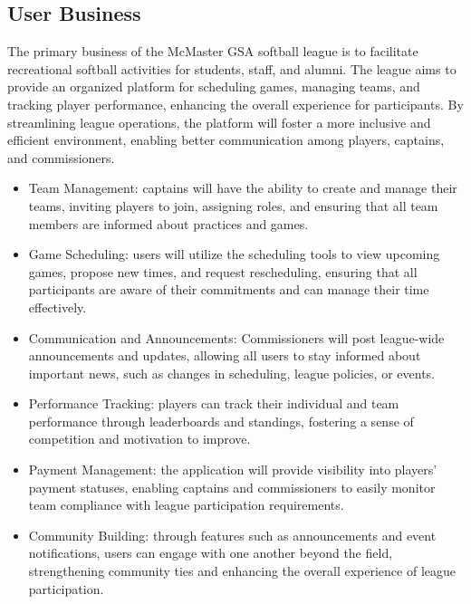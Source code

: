 \documentclass[12pt]{article}
\begin{document}
\subsection{User Business}
The primary business of the McMaster GSA softball league is to facilitate recreational softball activities for students, staff, and alumni. The league aims to provide an organized platform for scheduling games, managing teams, and tracking player performance, enhancing the overall experience for participants. By streamlining league operations, the platform will foster a more inclusive and efficient environment, enabling better communication among players, captains, and commissioners.\
\begin{itemize}
  \item Team Management: captains will have the ability to create and manage their teams, inviting players to join, assigning roles, and ensuring that all team members are informed about practices and games.
  \item Game Scheduling: users will utilize the scheduling tools to view upcoming games, propose new times, and request rescheduling, ensuring that all participants are aware of their commitments and can manage their time effectively.
  \item Communication and Announcements: Commissioners will post league-wide announcements and updates, allowing all users to stay informed about important news, such as changes in scheduling, league policies, or events.
  \item Performance Tracking: players can track their individual and team performance through leaderboards and standings, fostering a sense of competition and motivation to improve.
  \item Payment Management: the application will provide visibility into players' payment statuses, enabling captains and commissioners to easily monitor team compliance with league participation requirements.
  \item Community Building: through features such as announcements and event notifications, users can engage with one another beyond the field, strengthening community ties and enhancing the overall experience of league participation.
\end{itemize}
\end{document}
